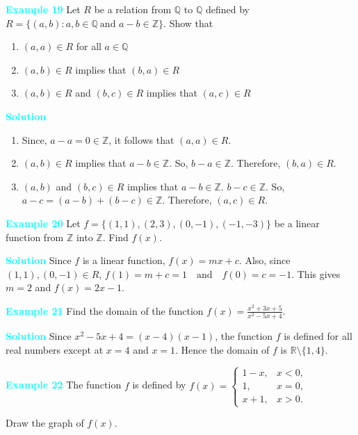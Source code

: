 \documentclass[11pt]{article}
\begin{document}
\noindent\textcolor{cyan}{\textbf{Example 19}}
Let $R$ be a relation from $\mathbb{Q}$ to $\mathbb{Q}$ defined by
$R=\{(a,b): a,b\in\mathbb{Q}\ \text{and } a-b\in\mathbb{Z}\}.$
Show that
\begin{enumerate}
\item $(a,a)\in R$ for all $a\in\mathbb{Q}$
\item $(a,b)\in R$ implies that $(b,a)\in R$
\item $(a,b)\in R$ and $(b,c)\in R$ implies that $(a,c)\in R$
\end{enumerate}

\noindent\textcolor{cyan}{\textbf{Solution}}
\begin{enumerate}
\item Since, $a-a=0\in\mathbb{Z}$, it follows that $(a,a)\in R$.
\item $(a,b)\in R$ implies that $a-b\in\mathbb{Z}$. So, $b-a\in\mathbb{Z}$.
Therefore, $(b,a)\in R$.
\item $(a,b)$ and $(b,c)\in R$ implies that $a-b\in\mathbb{Z}$.
$b-c\in\mathbb{Z}$. So,
$a-c=(a-b)+(b-c)\in\mathbb{Z}.$
Therefore, $(a,c)\in R$.
\end{enumerate}

\medskip
\noindent\textcolor{cyan}{\textbf{Example 20}}
Let $f=\{(1,1),(2,3),(0,-1),(-1,-3)\}$ be a linear function from
$\mathbb{Z}$ into $\mathbb{Z}$. Find $f(x)$.

\noindent\textcolor{cyan}{\textbf{Solution}}
Since $f$ is a linear function, $f(x)=mx+c$.
Also, since $(1,1),(0,-1)\in R$,
$f(1)=m+c=1 \quad \text{and} \quad f(0)=c=-1.$
This gives $m=2$ and $f(x)=2x-1$.

\medskip
\noindent\textcolor{cyan}{\textbf{Example 21}}
Find the domain of the function
$f(x)=\frac{x^{2}+3x+5}{x^{2}-5x+4}.$

\noindent\textcolor{cyan}{\textbf{Solution}}
Since $x^{2}-5x+4=(x-4)(x-1)$, the function $f$ is defined for all real
numbers except at $x=4$ and $x=1$.
Hence the domain of $f$ is
$\mathbb{R}\setminus\{1,4\}.$

\noindent\textcolor{cyan}{\textbf{Example 22}}  
The function $f$ is defined by
$f(x)=\begin{cases}
1-x, & x<0,\\[4pt]
1, & x=0,\\[4pt]
x+1, & x>0.
\end{cases}$

Draw the graph of $f(x)$.

\vspace{0.5em}
\end{document}
